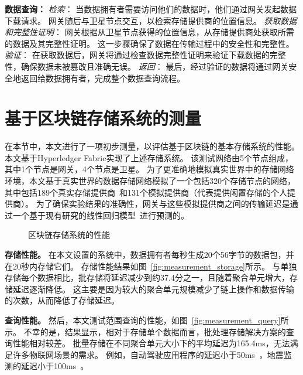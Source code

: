 \textbf{数据查询：}
\textit{检索}：
当数据拥有者需要访问他们的数据时，他们通过网关发起数据下载请求。
网关随后与卫星节点交互，以检索存储提供商的位置信息。
\textit{获取数据和完整性证明}：
网关根据从卫星节点获得的位置信息，从存储提供商处获取所需的数据及其完整性证明。
这一步骤确保了数据在传输过程中的安全性和完整性。
\textit{验证}：
在获取数据后，网关将通过检查数据完整性证明来验证下载数据的完整性，确保数据未被篡改且准确无误。
\textit{返回}：
最后，经过验证的数据将通过网关安全地返回给数据拥有者，完成整个数据查询流程。

\section{基于区块链存储系统的测量}
在本节中，本文进行了一项初步测量，以评估基于区块链的基本存储系统的性能。
本文基于Hyperledger Fabric实现了上述存储系统。
该测试网络由5个节点组成，其中1个节点是网关，4个节点是卫星。
为了更准确地模拟真实世界中的存储网络环境，本文基于真实世界的数据存储网络模拟了一个包括320个存储节点的网络，其中包括189个真实存储提供商~\cite{corneo2021surrounded}和131个模拟提供商（代表提供闲置存储的个人提供商）。
为了确保实验结果的准确性，网关与这些模拟提供商之间的传输延迟是通过一个基于现有研究的线性回归模型~\cite{ziviani2005improving}进行预测的。
\begin{figure*}[t]
    \centering
    \begin{minipage}{0.9\linewidth}
	    \centering
        \hfill
        \caption{区块链存储系统的性能} 
    \end{minipage}
\end{figure*}

\textbf{存储性能。}
在本文设置的系统中，数据拥有者每秒生成20个56字节的数据包，并在20秒内存储它们。
存储性能结果如图~\autoref{fig:measurement_storage}所示。
与单独存储每个数据相比，批存储将延迟减少到约37.4分之一，且随着聚合单元增大，存储延迟逐渐降低。
这主要是因为较大的聚合单元规模减少了链上操作和数据传输的次数，从而降低了存储延迟。

\textbf{查询性能。}
然后，本文测试范围查询的性能，如图~\autoref{fig:measurement_query}所示。
不幸的是，结果显示，相对于存储单个数据而言，批处理存储解决方案的查询性能相对较差。
批量存储在不同聚合单元大小下的平均延迟为165.4ms，无法满足许多物联网场景的需求。
例如，自动驾驶应用程序的延迟小于50ms~\cite{caesar2020nuscenes}，地震监测的延迟小于100ms~\cite{bhatia2023artificial}。

